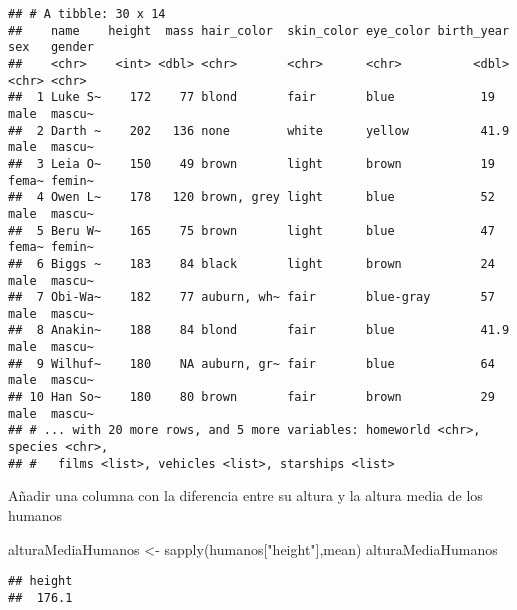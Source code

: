 \documentclass[
]{book}
\newenvironment{Shaded}{\begin{snugshade}}{\end{snugshade}}
\newcommand{\AttributeTok}[1]{\textcolor[rgb]{0.77,0.63,0.00}{#1}}
\newcommand{\FunctionTok}[1]{\textcolor[rgb]{0.00,0.00,0.00}{#1}}
\newcommand{\NormalTok}[1]{#1}
\newcommand{\OtherTok}[1]{\textcolor[rgb]{0.56,0.35,0.01}{#1}}
\newcommand{\SpecialCharTok}[1]{\textcolor[rgb]{0.00,0.00,0.00}{#1}}
\newcommand{\StringTok}[1]{\textcolor[rgb]{0.31,0.60,0.02}{#1}}
\begin{document}
\begin{verbatim}
## # A tibble: 30 x 14
##    name    height  mass hair_color  skin_color eye_color birth_year sex   gender
##    <chr>    <int> <dbl> <chr>       <chr>      <chr>          <dbl> <chr> <chr> 
##  1 Luke S~    172    77 blond       fair       blue            19   male  mascu~
##  2 Darth ~    202   136 none        white      yellow          41.9 male  mascu~
##  3 Leia O~    150    49 brown       light      brown           19   fema~ femin~
##  4 Owen L~    178   120 brown, grey light      blue            52   male  mascu~
##  5 Beru W~    165    75 brown       light      blue            47   fema~ femin~
##  6 Biggs ~    183    84 black       light      brown           24   male  mascu~
##  7 Obi-Wa~    182    77 auburn, wh~ fair       blue-gray       57   male  mascu~
##  8 Anakin~    188    84 blond       fair       blue            41.9 male  mascu~
##  9 Wilhuf~    180    NA auburn, gr~ fair       blue            64   male  mascu~
## 10 Han So~    180    80 brown       fair       brown           29   male  mascu~
## # ... with 20 more rows, and 5 more variables: homeworld <chr>, species <chr>,
## #   films <list>, vehicles <list>, starships <list>
\end{verbatim}

Añadir una columna con la diferencia entre su altura y la altura media de los humanos

\begin{Shaded}
\begin{Highlighting}[]
\NormalTok{alturaMediaHumanos }\OtherTok{\textless{}{-}} \FunctionTok{sapply}\NormalTok{(humanos[}\StringTok{"height"}\NormalTok{],mean)}
\NormalTok{alturaMediaHumanos}
\end{Highlighting}
\end{Shaded}

\begin{verbatim}
## height 
##  176.1
\end{verbatim}

\begin{Shaded}
\end{Shaded}
\end{document}
